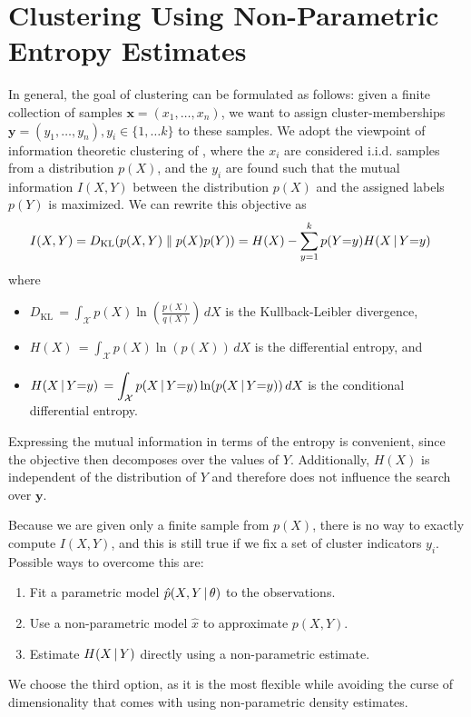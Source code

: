 \section{Clustering Using Non-Parametric Entropy Estimates}
In general, the goal of clustering can be formulated as follows: 
given a finite collection of samples $\mathbf{x} = (x_1, \dotsc, x_n)$, we want to 
assign cluster-memberships $\mathbf{y} = (y_1, \dotsc, y_n ), y_i \in \{1, \dotsc k\}$ to these samples.
%
We adopt the viewpoint of information theoretic clustering of \citet{gokcay2002information}, 
where the $x_i$ are considered i.i.d{.} samples from a distribution $p(X)$, and the 
$y_i$ are found such that the mutual information $I(X, Y)$ between the distribution $p(X)$ and the
assigned labels $p(Y)$ is maximized.
We can rewrite this objective as 
\begin{align}
         I(X, Y)
        &= D_{\text{KL}}(p(X, Y) \parallel p(X) p(Y)) = H(X) - \sum_{y=1}^k p(Y{=}y) H(X \, | \, Y {=} y)
\end{align}
where
\begin{itemize}
\item $\displaystyle D_\text{KL}\, = \int_\mathcal{X} p(X) \ln\left(\frac{p(X)}{q(X)}\right)\,dX$ is the Kullback-Leibler divergence,
\item $\displaystyle H(X)\, = \int_\mathcal{X} p(X) \ln(p(X))\,dX$ is the differential entropy, and
\item $\displaystyle H(X \, | \, Y{=}y)\, = \int_\mathcal{X} p(X \, | \, Y {=}y) \ln(p(X \, | \, Y {=} y))\,dX$ is the conditional differential entropy.
    \end{itemize}
Expressing the mutual information in terms of the entropy is convenient, since
the objective then decomposes over the values of $Y$. 
%
Additionally, $H(X)$ is independent of the distribution of $Y$ and therefore
does not influence the search over $\mathbf{y}$.

Because we are given only a finite sample from $p(X)$, there is no way to
exactly compute $I(X, Y)$, and this is still true if we fix a set of cluster
indicators $y_i$.
%
Possible ways to overcome this are:
\begin{enumerate}
    \item Fit a parametric model $\hat{p}(X, Y \, | \, \theta)$ to the observations.
    \item Use a non-parametric model $\hat{x}$ to approximate $p(X, Y)$. 
    \item Estimate $H(X \, | \, Y)$ directly using a non-parametric estimate.
\end{enumerate}
We choose the third option, as it is the most flexible while avoiding
the curse of dimensionality that comes with using non-parametric density estimates.


